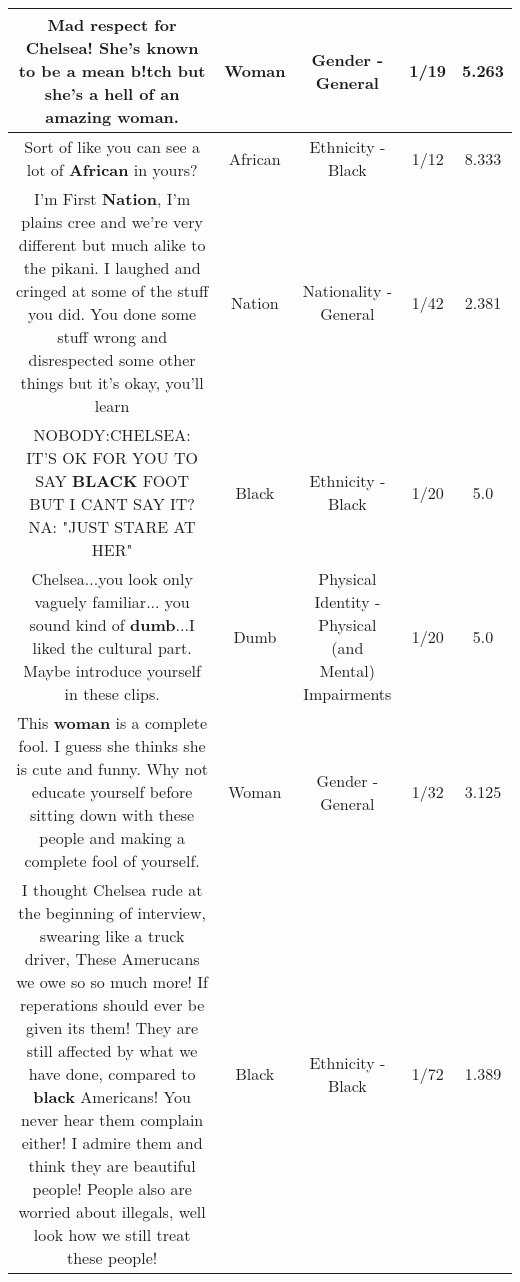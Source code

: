 \documentclass[11pt]{article}
\newlength\mylength
\begin{document}
\begin{center}
\begin{longtable}{|C{.65\mylength}|C{.30\mylength}|C{.12\mylength}|C{.12\mylength}|C{.12\mylength}|}
  \small Mad respect for Chelsea! She's known to be a mean b!tch but she's a hell of an amazing \textbf{woman}.\normalsize   & Woman & Gender - General & 1/19 & 5.263 \\  \hline
  \small Sort of like you can see a lot of \textbf{African} in yours?\normalsize   & African & Ethnicity - Black & 1/12 & 8.333 \\  \hline
  \small I'm First \textbf{Nation}, I'm plains cree and we're very different but much alike to the pikani. I laughed and cringed at some of the stuff you did. You done some stuff wrong and disrespected some other things but it's okay, you'll learn\normalsize   & Nation & Nationality - General & 1/42 & 2.381 \\  \hline
  \small NOBODY:CHELSEA: IT'S OK FOR YOU TO SAY \textbf{BLACK} FOOT BUT I CANT SAY IT?NA: "JUST STARE AT HER"\normalsize   & Black & Ethnicity - Black & 1/20 & 5.0 \\  \hline
  \small Chelsea...you look only vaguely familiar... you sound kind of \textbf{dumb}...I liked the cultural part. Maybe introduce yourself in these clips.\normalsize   & Dumb & Physical Identity - Physical (and Mental) Impairments & 1/20 & 5.0 \\  \hline
  \small This \textbf{woman} is a complete fool. I guess she thinks she is cute and funny. Why not educate yourself before sitting down with these people and making a complete fool of yourself.\normalsize   & Woman & Gender - General & 1/32 & 3.125 \\  \hline
  \small I thought Chelsea rude at the beginning of interview, swearing like a truck driver,  These Amerucans we owe so so much more! If reperations should ever be given its them! They are still affected by what we have done, compared to \textbf{black} Americans!  You never hear them complain either!  I admire them and think they are beautiful people!  People also are worried about illegals, well look how we still treat these people!\normalsize   & Black & Ethnicity - Black & 1/72 & 1.389 \\  \hline

\end{longtable}
\end{center}
\end{document}
